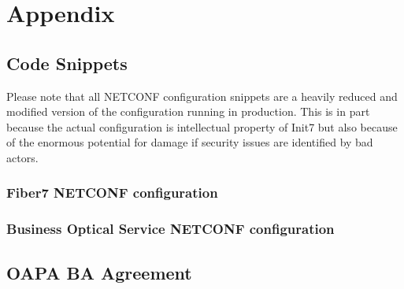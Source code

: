 \chapter{\label{appendix}Appendix}
\thispagestyle{fancy}

\section{Code Snippets}

Please note that all NETCONF configuration snippets are a heavily reduced
and modified version of the configuration running in production.
This is in part because the actual configuration is intellectual property of Init7
but also because of the enormous potential for damage if security issues are
identified by bad actors.

\subsection{\label{code:nc-fiber7}Fiber7 NETCONF configuration}



\subsection{\label{code:nc-s2s}Business Optical Service NETCONF configuration}



\section{OAPA BA Agreement}

